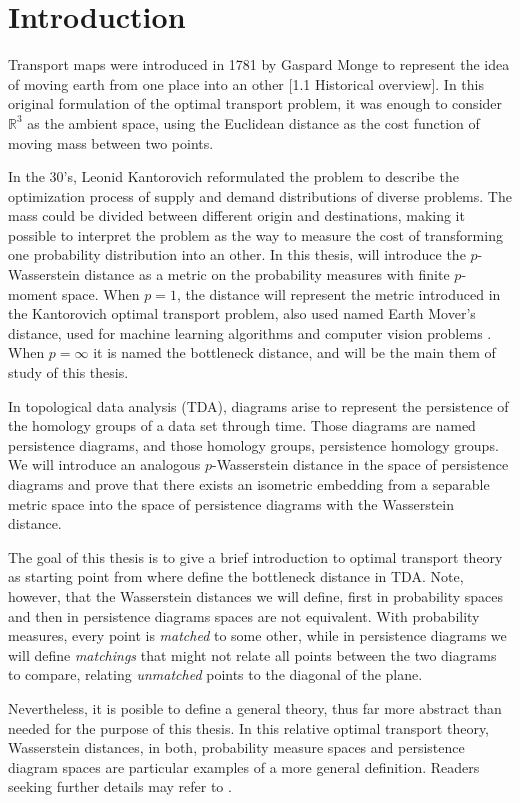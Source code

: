 \section{Introduction}

Transport maps were introduced in 1781 by Gaspard Monge to represent the idea of moving earth from one place into an other \cite{Figalli}[1.1 Historical overview]. In this original formulation of the optimal transport problem, it was enough to consider $ \mathbb R^3 $ as the ambient space, using the Euclidean distance as the cost function of moving mass between two points.

In the 30's, Leonid Kantorovich reformulated the problem to describe the optimization process of supply and demand distributions of diverse problems. The mass could be divided between different origin and destinations, making it possible to interpret the problem as the way to measure the cost of transforming one probability distribution into an other. In this thesis, will introduce the $p$-Wasserstein distance as a metric on the probability measures with finite $p$-moment space. When $ p = 1 $, the distance will represent the metric introduced in the Kantorovich optimal transport problem, also used named Earth Mover's distance, used for machine learning algorithms and computer vision problems \cite{earth}. When $p = \infty $ it is named the bottleneck distance, and will be the main them of study of this thesis.

In topological data analysis (TDA), diagrams arise to represent the 
persistence of the homology groups of a data set through time. Those diagrams are named persistence diagrams, and those homology groups, persistence homology groups. We will introduce an analogous $p$-Wasserstein distance in the space of persistence diagrams and prove that there exists an isometric embedding  from a separable metric space into the space of persistence diagrams with the Wasserstein distance.

The goal of this thesis is to give a brief introduction to optimal transport theory as starting point from where define the bottleneck distance in TDA. Note, however, that the Wasserstein distances we will define, first in probability spaces and then in persistence diagrams spaces are not equivalent. With probability measures, every point is {\it matched} to some other, while in persistence diagrams we will define {\it matchings} that might not relate all points between the two diagrams to compare, relating {\it unmatched} points to the diagonal of the plane.

Nevertheless, it is posible to define a general theory, thus far more abstract than needed for the purpose of this thesis. In this relative optimal transport theory, Wasserstein distances, in both, probability measure spaces and persistence diagram spaces are particular examples of a more general definition. Readers seeking further details may refer to \cite{Elchesen}.